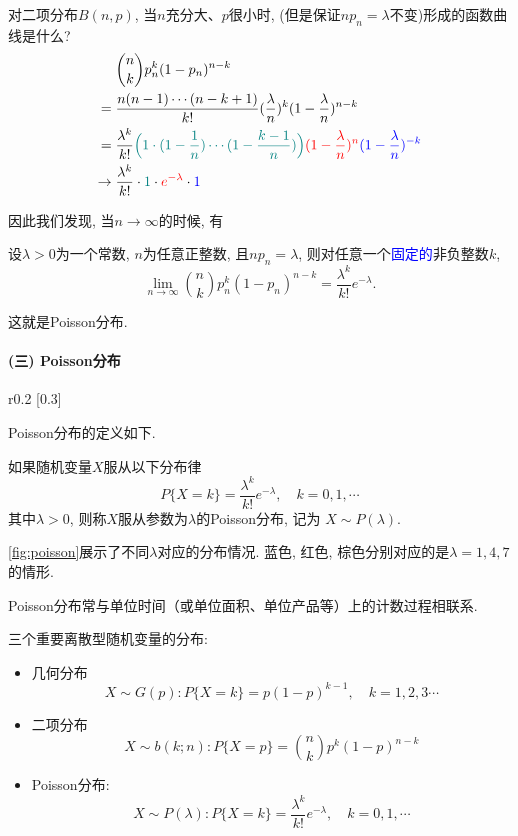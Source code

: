 对二项分布$B(n,p)$, 当$n$充分大、$p$很小时, (但是保证$np_n=\lambda$不变)形成的函数曲线是什么?
\begin{align*}
                   & {n \choose k}p_n^k(1-p_n)^{n-k}                                                                                                                                                    \\
    ={}            & \frac{n(n-1)\cdots (n-k+1)}{k!}(\frac{\lambda}{n})^k(1-\frac{\lambda}{n})^{n-k}                                                                                                    \\
    ={}            & \frac{\lambda^k}{k!}\textcolor{teal}{\Big(1\cdot (1-\frac{1}{n})\cdots (1-\frac{k-1}{n})\Big)}\textcolor{red}{(1-\frac{\lambda}{n})^n}\textcolor{blue}{(1-\frac{\lambda}{n})^{-k}} \\
    \rightarrow {} & \frac{\lambda^k}{k!}\cdot \textcolor{teal}{1}\cdot \textcolor{red}{e^{-\lambda}}\cdot \textcolor{blue}{1}
\end{align*}

因此我们发现, 当$n\to\infty$的时候, 有
\begin{theorem}
    设$\lambda>0$为一个常数, $n$为任意正整数, 且$np_n=\lambda$, 则对任意一个\textcolor{blue}{固定的}非负整数$k$, 
    $$
        \lim_{n\rightarrow \infty}{n\choose k}p_n^k(1-p_n)^{n-k}=\frac{\lambda^k}{k!}e^{-\lambda}.
    $$
\end{theorem}
这就是Poisson分布.

\paragraph{(三) Poisson分布}

\begin{wrapfigure}{r}{0.2\textwidth}
    \scalebox{0.3}[0.3]{ }
    \caption{Poisson分布}
    \label{fig:poisson}
\end{wrapfigure}
Poisson分布的定义如下.
\begin{definition}[Poisson分布]
    如果随机变量$X$服从以下分布律
    \[ P\{X=k\}=\frac{\lambda^k}{k!}e^{-\lambda},\quad k=0,1,\cdots \]
    其中$\lambda>0$, 则称$X$服从参数为$\lambda$的Poisson分布, 记为
    $X\sim P(\lambda).$
\end{definition}%
\cref{fig:poisson}展示了不同$\lambda$对应的分布情况. 蓝色, 红色, 棕色分别对应的是$\lambda=1,4,7$的情形.

Poisson分布常与单位时间（或单位面积、单位产品等）上的计数过程相联系.


\begin{takeaway}
    三个重要离散型随机变量的分布:
    \begin{itemize}
        \item 几何分布$$X\sim G(p): P\{X=k\}=p(1-p)^{k-1}, \quad k=1,2,3 \cdots$$
        \item 二项分布$$X\sim b(k ; n): P\{X=p\}=\binom nk p^k(1-p)^{n-k}$$
        \item Poisson分布: $$X\sim P(\lambda): P\{X=k\}=\frac{\lambda^k}{k !} e^{-\lambda}, \quad k=0,1, \cdots$$
    \end{itemize}
\end{takeaway}